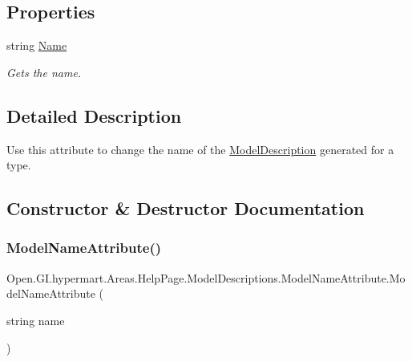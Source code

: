 \subsection*{Properties}
\begin{DoxyCompactItemize}
\item 
string \hyperlink{class_open_1_1_g_i_1_1hypermart_1_1_areas_1_1_help_page_1_1_model_descriptions_1_1_model_name_attribute_a1388599f97bb13f4b52da9cebfd994d3}{Name}
\begin{DoxyCompactList}\small\item\em Gets the name. \end{DoxyCompactList}\end{DoxyCompactItemize}


\subsection{Detailed Description}
Use this attribute to change the name of the \hyperlink{class_open_1_1_g_i_1_1hypermart_1_1_areas_1_1_help_page_1_1_model_descriptions_1_1_model_description}{Model\+Description} generated for a type. 



\subsection{Constructor \& Destructor Documentation}
\hypertarget{class_open_1_1_g_i_1_1hypermart_1_1_areas_1_1_help_page_1_1_model_descriptions_1_1_model_name_attribute_a993a54c4cc771558eef5ea586b70d6d7}{}\label{class_open_1_1_g_i_1_1hypermart_1_1_areas_1_1_help_page_1_1_model_descriptions_1_1_model_name_attribute_a993a54c4cc771558eef5ea586b70d6d7} 
\subsubsection{\texorpdfstring{Model\+Name\+Attribute()}{ModelNameAttribute()}}
{\footnotesize\ttfamily Open.\+G\+I.\+hypermart.\+Areas.\+Help\+Page.\+Model\+Descriptions.\+Model\+Name\+Attribute.\+Model\+Name\+Attribute (\begin{DoxyParamCaption}\item[{string}]{name }\end{DoxyParamCaption})}



